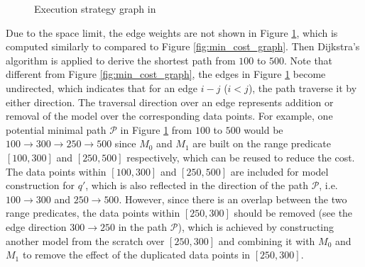 \begin{figure}[t]
\begin{center}
\end{center}
\caption{Execution strategy graph in \cite{gupta2015processing}}
\label{fig:min_cost_graph2}
\end{figure}

Due to the space limit, the edge weights are not shown in Figure \ref{fig:min_cost_graph2}, which is computed similarly to compared to Figure \ref{fig:min_cost_graph}. Then Dijkstra's algorithm is applied to derive the shortest path from $100$ to $500$. Note that different from Figure \ref{fig:min_cost_graph}, the edges in Figure \ref{fig:min_cost_graph2} become undirected, which indicates that for an edge $i-j$ ($i < j$), the path traverse it by either direction. The traversal direction over an edge represents addition or removal of the model over the corresponding data points. For example, one potential minimal path $\mathcal{P}$ in Figure \ref{fig:min_cost_graph2} from $100$ to $500$ would be $100\rightarrow 300 \rightarrow 250 \rightarrow 500$ since $M_0$ and $M_1$ are built on the range predicate $[100, 300]$ and $[250, 500]$ respectively, which can be reused to reduce the cost. The data points within $[100, 300]$ and $[250, 500]$ are included for model construction for $q'$, which is also reflected in the direction of the path $\mathcal{P}$, i.e. $100 \rightarrow 300$ and $250 \rightarrow 500$. However, since there is an overlap between the two range predicates, the data points within $[250, 300]$ should be removed (see the edge direction $300\rightarrow250$ in the path $\mathcal{P}$), which is achieved by constructing another model from the scratch over $[250, 300]$ and combining it with $M_0$ and $M_1$ to remove the effect of the duplicated data points in $[250, 300]$.

